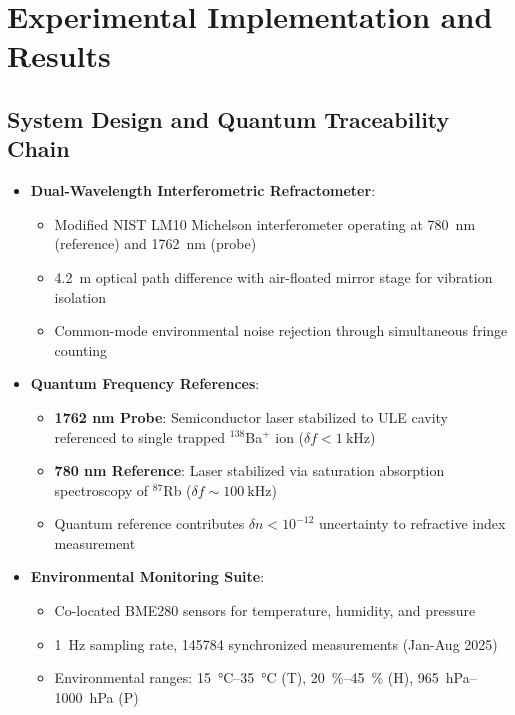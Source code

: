 \documentclass[aip,reprint,groupedaddress,onecolumn,superscriptaddress]{revtex4-2}
\begin{document}
\section{Experimental Implementation and Results}

\subsection{System Design and Quantum Traceability Chain}
\begin{itemize}
    \item \textbf{Dual-Wavelength Interferometric Refractometer}:
    \begin{itemize}
        \item Modified NIST LM10 Michelson interferometer operating at \SI{780}{\nano\meter} (reference) and \SI{1762}{\nano\meter} (probe)
        \item \SI{4.2}{\meter} optical path difference with air-floated mirror stage for vibration isolation
        \item Common-mode environmental noise rejection through simultaneous fringe counting
    \end{itemize}
    
    \item \textbf{Quantum Frequency References}:
    \begin{itemize}
        \item \textbf{1762 nm Probe}: Semiconductor laser stabilized to ULE cavity referenced to single trapped $^{138}$Ba$^+$ ion ($\delta f < \SI{1}{\kilo\hertz}$)
        \item \textbf{780 nm Reference}: Laser stabilized via saturation absorption spectroscopy of $^{87}$Rb ($\delta f \sim \SI{100}{\kilo\hertz}$)
        \item Quantum reference contributes $\delta n < 10^{-12}$ uncertainty to refractive index measurement
    \end{itemize}
    
    \item \textbf{Environmental Monitoring Suite}:
    \begin{itemize}
        \item Co-located BME280 sensors for temperature, humidity, and pressure
        \item \SI{1}{\hertz} sampling rate, \num{145784} synchronized measurements (Jan-Aug 2025)
        \item Environmental ranges: \SIrange{15}{35}{\degreeCelsius} (T), \SIrange{20}{45}{\percent} (H), \SIrange{965}{1000}{\hecto\pascal} (P)
    \end{itemize}
\end{itemize}
\end{document}
